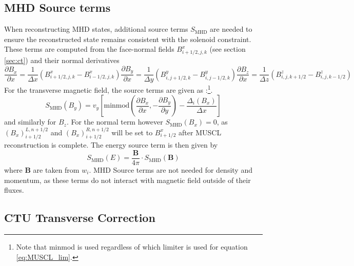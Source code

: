 \documentclass[11pt]{report}
\newcommand{\pd}[2]{\frac{\partial #1}{\partial #2}}
\begin{document}
\subsection{MHD Source terms} \label{sec:MUSCL_MHD_src}

When reconstructing MHD states, additional source terms $S_\mathrm{MHD}$ are needed to ensure the reconstructed state remains consistent with the solenoid constraint.
 These terms are computed from the face-normal fields $B^x_{i+1/2,j,k}$ (see section \ref{sec:ct}) and their normal derivatives 
 \begin{subequations}
 \begin{equation} \pd{B_x}{x} = \frac{1}{\Delta x} \left(B^x_{i+1/2,j,k} - B^x_{i-1/2,j,k}\right) \end{equation}
 \begin{equation} \pd{B_y}{x} = \frac{1}{\Delta y} \left(B^y_{i,j+1/2,k} - B^y_{i,j-1/2,k}\right) \end{equation}
 \begin{equation} \pd{B_z}{x} = \frac{1}{\Delta z} \left(B^z_{i,j,k+1/2} - B^z_{i,j,k-1/2}\right) \end{equation}
 \end{subequations}
For the transverse magnetic field, the source terms are given as \citep{GardinerStone2008}:\footnote{Note that minmod is used regardless of which limiter is used for equation \ref{eq:MUSCL_lim}.
}. 
\begin{equation} 
S_\mathrm{MHD}(B_y) = v_y \left[ \mathrm{minmod}\left(\pd{B_x}{x}, -\pd{B_y}{y}\right) - \frac{\Delta_i(B_x)}{\Delta x}\right]
\end{equation}
and similarly for $B_z$. For the normal term however  $S_\mathrm{MHD}(B_x) = 0$, as $(B_x)_{i+1/2}^{L,n+1/2}$ and $(B_x)_{i+1/2}^{R,n+1/2}$ will be set to $B^x_{i+1/2}$ after MUSCL reconstruction is complete.
The energy source term is then given by 
\begin{equation}
S_\mathrm{MHD}(E) = \frac{\mathbf{B}}{4\pi} \cdot S_\mathrm{MHD}(\mathbf{B}) 
\end{equation}
where $\mathbf B$ are taken from $w_i$.
MHD Source terms are not needed for density and momentum, as these terms do not interact with magnetic field outside of their fluxes.




\subsection{CTU Transverse Correction}
\label{sec:ctu}
\end{document}
